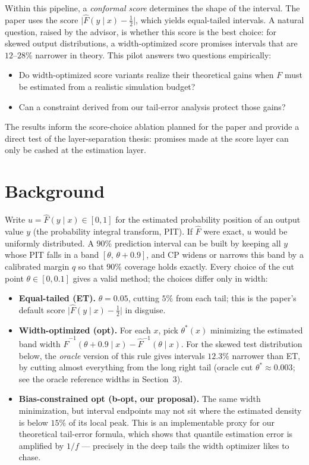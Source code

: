 \documentclass[11pt]{article}
\newcommand{\Fhat}{\widehat{F}}
\begin{document}
Within this pipeline, a \emph{conformal score} determines the shape of the
interval. The paper uses the score $\lvert \Fhat(y\mid x) - \tfrac12 \rvert$,
which yields equal-tailed intervals. A natural question, raised by the
advisor, is whether this score is the best choice: for skewed output
distributions, a width-optimized score promises intervals that are
$12$--$28\%$ narrower in theory. This pilot answers two questions
empirically:
\begin{itemize}
  \item[\textbf{Q1}] Do width-optimized score variants realize their
  theoretical gains when $F$ must be estimated from a realistic simulation
  budget?
  \item[\textbf{Q2}] Can a constraint derived from our tail-error analysis
  protect those gains?
\end{itemize}
The results inform the score-choice ablation planned for the paper and
provide a direct test of the layer-separation thesis: promises made at the
score layer can only be cashed at the estimation layer.

\section{Background}

Write $u = \Fhat(y \mid x) \in [0,1]$ for the estimated probability position
of an output value $y$ (the probability integral transform, PIT). If $\Fhat$
were exact, $u$ would be uniformly distributed. A $90\%$ prediction interval
can be built by keeping all $y$ whose PIT falls in a band
$[\theta,\, \theta + 0.9]$, and CP widens or narrows this band by a
calibrated margin $\hat q$ so that $90\%$ coverage holds exactly. Every
choice of the cut point $\theta \in [0, 0.1]$ gives a valid method; the
choices differ only in width:
\begin{itemize}
  \item \textbf{Equal-tailed (ET).} $\theta = 0.05$, cutting $5\%$ from each
  tail; this is the paper's default score
  $\lvert \Fhat(y \mid x) - \tfrac12 \rvert$ in disguise.
  \item \textbf{Width-optimized (opt).} For each $x$, pick $\theta^{*}(x)$
  minimizing the estimated band width
  $\Fhat^{-1}(\theta + 0.9 \mid x) - \Fhat^{-1}(\theta \mid x)$. For the
  skewed test distribution below, the \emph{oracle} version of this rule
  gives intervals $12.3\%$ narrower than ET, by cutting almost everything
  from the long right tail (oracle cut $\theta^{*} \approx 0.003$; see the
  oracle reference widths in Section~3).
  \item \textbf{Bias-constrained opt (b-opt, our proposal).} The same width
  minimization, but interval endpoints may not sit where the estimated
  density is below $15\%$ of its local peak. This is an implementable proxy
  for our theoretical tail-error formula, which shows that quantile
  estimation error is amplified by $1/f$ --- precisely in the deep tails the
  width optimizer likes to chase.
\end{itemize}
\end{document}
